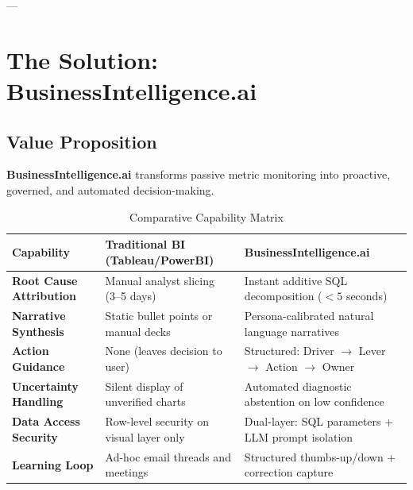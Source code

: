 \documentclass[11pt,a4paper]{article}
\begin{document}
---

\section{The Solution: BusinessIntelligence.ai}

\subsection{Value Proposition}
\textbf{BusinessIntelligence.ai} transforms passive metric monitoring into proactive, governed, and automated decision-making.

\begin{table}[h!]
\centering
\small
\begin{tabularx}{\textwidth}{>{\raggedright\arraybackslash}p{4cm} >{\raggedright\arraybackslash}X >{\raggedright\arraybackslash}X}
\toprule
\textbf{Capability} & \textbf{Traditional BI (Tableau/PowerBI)} & \textbf{BusinessIntelligence.ai} \\
\midrule
\textbf{Root Cause Attribution} & Manual analyst slicing (3--5 days) & Instant additive SQL decomposition ($<5$ seconds) \\
\textbf{Narrative Synthesis} & Static bullet points or manual decks & Persona-calibrated natural language narratives \\
\textbf{Action Guidance} & None (leaves decision to user) & Structured: Driver $\to$ Lever $\to$ Action $\to$ Owner \\
\textbf{Uncertainty Handling} & Silent display of unverified charts & Automated diagnostic abstention on low confidence \\
\textbf{Data Access Security} & Row-level security on visual layer only & Dual-layer: SQL parameters + LLM prompt isolation \\
\textbf{Learning Loop} & Ad-hoc email threads and meetings & Structured thumbs-up/down + correction capture \\
\bottomrule
\end{tabularx}
\caption{Comparative Capability Matrix}
\end{table}
\end{document}
